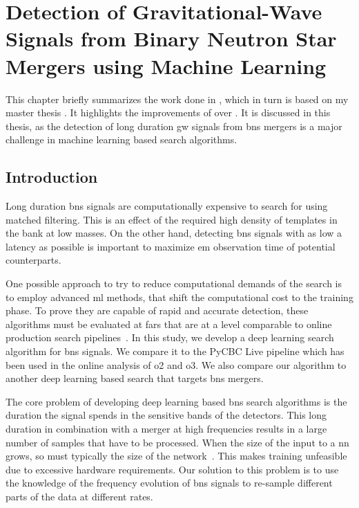 \chapter{Detection of Gravitational-Wave Signals from Binary Neutron Star Mergers using Machine Learning}\label{ch:bns}
This chapter briefly summarizes the work done in \cite{Schafer:2020kor}, which in turn is based on my master thesis \cite{Schaefer:2019:MSC}. It highlights the improvements of \cite{Schafer:2020kor} over \cite{Schaefer:2019:MSC}. It is discussed in this thesis, as the detection of long duration \acrshort{gw} signals from \acrshort{bns} mergers is a major challenge in machine learning based search algorithms.

\section{Introduction}
Long duration \acrshort{bns} signals are computationally expensive to search for using matched filtering. This is an effect of the required high density of templates in the bank at low masses. On the other hand, detecting \acrshort{bns} signals with as low a latency as possible is important to maximize \acrshort{em} observation time of potential counterparts.

One possible approach to try to reduce computational demands of the search is to employ advanced \acrshort{ml} methods, that shift the computational cost to the training phase. To prove they are capable of rapid and accurate detection, these algorithms must be evaluated at \acrshort{far}s that are at a level comparable to online production search pipelines~\cite{Nitz:2018rgo}. In this study, we develop a deep learning search algorithm for \acrshort{bns} signals. We compare it to the PyCBC Live pipeline which has been used in the online analysis of \acrshort{o2} and \acrshort{o3}. We also compare our algorithm to another deep learning based search that targets \acrshort{bns} mergers.

The core problem of developing deep learning based \acrshort{bns} search algorithms is the duration the signal spends in the sensitive bands of the detectors. This long duration in combination with a merger at high frequencies results in a large number of samples that have to be processed. When the size of the input to a \acrshort{nn} grows, so must typically the size of the network~\cite{Goodfellow:2016:DNN}. This makes training unfeasible due to excessive hardware requirements. Our solution to this problem is to use the knowledge of the frequency evolution of \acrshort{bns} signals to re-sample different parts of the data at different rates.

